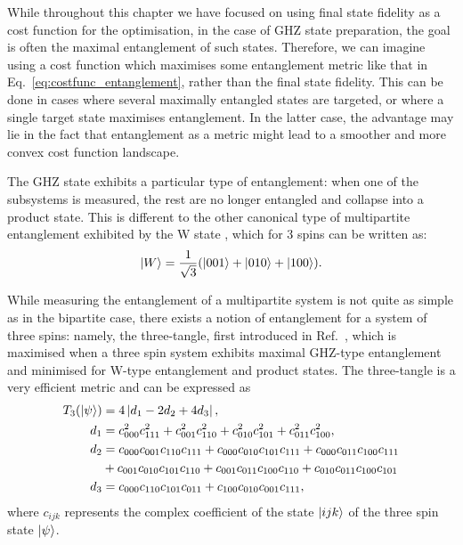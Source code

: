 \documentclass[a4paper,oneside,11pt]{book}
\begin{document}
While throughout this chapter we have focused on using final state fidelity as a cost function for the optimisation, in the case of GHZ state preparation, the goal is often the maximal entanglement of such states. Therefore, we can imagine using a cost function which maximises some entanglement metric like that in Eq.~\eqref{eq:costfunc_entanglement}, rather than the final state fidelity. This can be done in cases where several maximally entangled states are targeted, or where a single target state maximises entanglement. In the latter case, the advantage may lie in the fact that entanglement as a metric might lead to a smoother and more convex cost function landscape.

The GHZ state exhibits a particular type of entanglement: when one of the subsystems is measured, the rest are no longer entangled and collapse into a product state. This is different to the other canonical type of multipartite entanglement exhibited by the W state \cite{cabello_bells_2002}, which for 3 spins can be written as:
\begin{equation}\label{eq:W_state}
    \ket{W} = \frac{1}{\sqrt{3}}(\ket{001} + \ket{010} + \ket{100}).
\end{equation}

While measuring the entanglement of a multipartite system is not quite as simple as in the bipartite case, there exists a notion of entanglement for a system of three spins: namely, the three-tangle, first introduced in Ref.~\cite{coffman_distributed_2000}, which is maximised when a three spin system exhibits maximal GHZ-type entanglement and minimised for W-type entanglement and product states. The three-tangle is a very efficient metric and can be expressed as
\begin{equation}\label{eq:3-tangle}
	\begin{aligned}
		T_3(\ket{\psi}) &= 4 \left| d_1 - 2 d_2 + 4 d_3 \right|, \\
		d_1 &= c^2_{000}c^2_{111} + c^2_{001}c^2_{110} + c^2_{010}c^2_{101} + c^2_{011}c^2_{100}, \\
		d_2 &= c_{000}c_{001}c_{110}c_{111} + c_{000}c_{010}c_{101}c_{111} + c_{000}c_{011}c_{100}c_{111} \\
		 &+ c_{001}c_{010}c_{101}c_{110} + c_{001}c_{011}c_{100}c_{110} + c_{010}c_{011}c_{100}c_{101} \\
		d_3 &= c_{000}c_{110}c_{101}c_{011} + c_{100}c_{010}c_{001}c_{111},
	\end{aligned}
\end{equation}
where $c_{ijk}$ represents the complex coefficient of the state $\ket{ijk}$ of the three spin state $\ket{\psi}$. 
\end{document}
